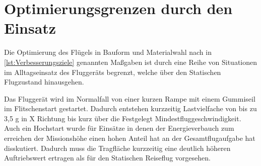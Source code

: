 \section{Optimierungsgrenzen durch den Einsatz}

Die Optimierung des Flügels in Bauform und Materialwahl nach in \ref{lst:Verbesserungsziele} genannten Maßgaben ist durch eine Reihe von Situationen im Alltagseinsatz des Fluggeräts begrenzt, welche über den Statischen Flugzustand hinausgehen.

Das Fluggerät wird im Normalfall von einer kurzen Rampe mit einem Gummiseil im Flitschenstart gestartet. Dadurch entstehen kurzzeitig Lastvielfache von bis zu 3,5 g in X Richtung bis kurz über die Festgelegt Mindestfluggeschwindigkeit.
Auch ein Hochstart wurde für Einsätze in denen der Energieverbauch zum erreichen der Missionshöhe einen hohen Anteil hat an der Gesamtflugaufgabe hat disskutiert. 
Dadurch muss die Tragfläche kurzzeitig eine deutlich höheren Auftriebswert ertragen als für den Statischen Reiseflug vorgesehen. 